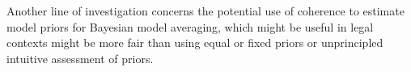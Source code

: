 \documentclass[10pt,]{scrartcl}
\begin{document}


Another line of investigation concerns
the potential use of coherence to   estimate model priors for Bayesian model averaging, which might be useful in legal contexts might be more fair  than using equal or fixed priors or unprincipled intuitive assessment of priors. 






























\end{document}
